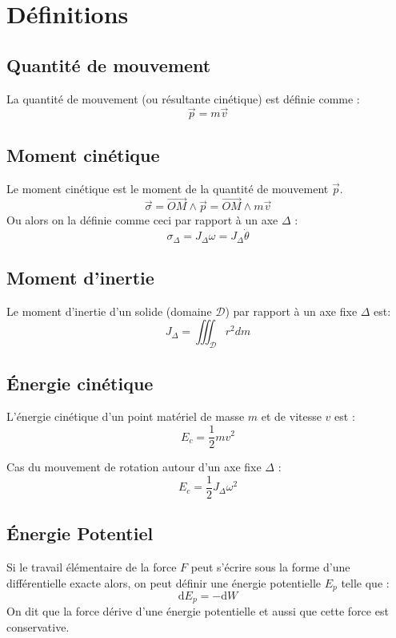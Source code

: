 \documentclass[a4paper,12pt]{article}
\newcommand{\diff}{\mathrm{d}} %
\renewcommand{\vec}{\overrightarrow}  %
\begin{document}
    \section{Définitions}

    \begin{multicols}{2}
        
        \subsection{Quantité de mouvement}
            La quantité de mouvement (ou résultante cinétique) est définie comme :
                $$\vec{p} = m \vec{v}$$

        \subsection{Moment cinétique}
            Le moment cinétique est le moment de la quantité de mouvement $\vec{p}$.
                $$ \vec \sigma = \vec{OM} \wedge \vec p = \vec{OM} \wedge m \vec v $$
            Ou alors on la définie comme ceci par rapport à un axe $\Delta$ :
                $$ \sigma_\Delta = J_\Delta \omega = J_\Delta \dot \theta $$ 
        
        \subsection{Moment d'inertie}
            Le moment d'inertie d'un solide (domaine $\mathcal{D}$) par rapport à un axe fixe $\Delta$ est:
                $$ J_\Delta = \iiint_{\mathcal{D}} r^2 dm $$



        \subsection{Énergie cinétique}
            L'énergie cinétique d'un point matériel de masse $m$ et de vitesse $v$ est : 
                $$ E_c = \frac{1}{2} m v^2 $$

            Cas du mouvement de rotation autour d'un axe fixe $\Delta$ :
                $$ E_c = \frac{1}{2} J_\Delta \omega^2 $$

        \subsection{Énergie Potentiel}

            Si le travail élémentaire de la force $F$ peut s'écrire sous la
            forme d'une différentielle exacte alors, on peut définir
            une énergie potentielle $E_p$ telle que :
            $$ \diff E_p = -\diff W $$
            On dit que la force dérive d'une énergie potentielle et 
            aussi que cette force est conservative.


\end{multicols}
\end{document}
